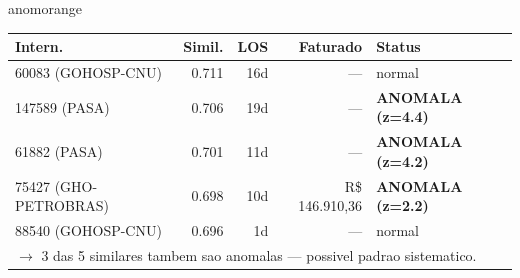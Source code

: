 \documentclass[a4paper,10pt]{article}
\begin{document}
\begin{anomalycard}[Internacao 159453 | GHO-PETROBRAS | ALTO (z=4.06)]{anomorange}
\begin{tabular}{l r r r l}\toprule\textbf{Intern.} & \textbf{Simil.} & \textbf{LOS} & \textbf{Faturado} & \textbf{Status} \\\midrule
60083 (GOHOSP-CNU) & 0.711 & 16d & --- & \textcolor{jcubeblue}{normal} \\
147589 (PASA) & 0.706 & 19d & --- & \textcolor{anomred}{\textbf{ANOMALA (z=4.4)}} \\
61882 (PASA) & 0.701 & 11d & --- & \textcolor{anomred}{\textbf{ANOMALA (z=4.2)}} \\
75427 (GHO-PETROBRAS) & 0.698 & 10d & R\$ 146.910,36 & \textcolor{anomred}{\textbf{ANOMALA (z=2.2)}} \\
88540 (GOHOSP-CNU) & 0.696 & 1d & --- & \textcolor{jcubeblue}{normal} \\
\multicolumn{5}{l}{\textcolor{anomred}{\small $\rightarrow$ 3 das 5 similares tambem sao anomalas --- possivel padrao sistematico.}} \\
\bottomrule\end{tabular}


\end{anomalycard}

\newpage
\end{document}
